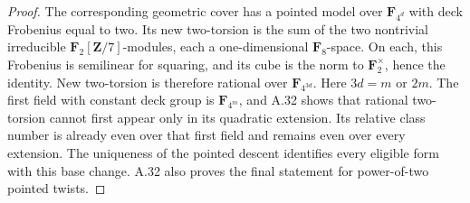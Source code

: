 \documentclass[11pt]{article}
\begin{document}
\begin{proof}
The corresponding geometric cover has a pointed model over
$\mathbf F_{4^d}$ with deck Frobenius equal to two.
Its new two-torsion is the sum of the two nontrivial irreducible
$\mathbf F_2[\mathbf Z/7]$-modules, each a one-dimensional
$\mathbf F_8$-space. On each, this Frobenius is semilinear for
squaring, and its cube is the norm to $\mathbf F_2^\times$,
hence the identity. New two-torsion is therefore rational over
$\mathbf F_{4^{3d}}$.
Here $3d=m$ or $2m$. The first field with constant deck group is
$\mathbf F_{4^m}$, and A.32 shows that rational two-torsion cannot
first appear only in its quadratic extension.
Its relative class number is already even over that first field
and remains even over every extension.
The uniqueness of the pointed descent identifies every eligible
form with this base change. A.32 also proves the final statement
for power-of-two pointed twists.
\end{proof}
\end{document}
